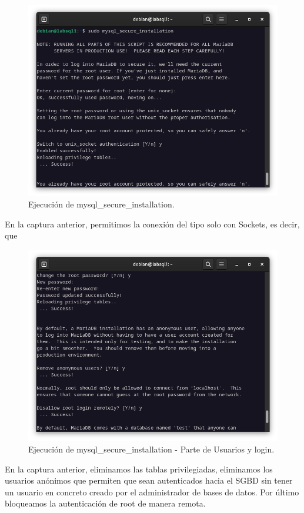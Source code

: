 \begin{figure}[H]
	\centering
	\includegraphics[scale=0.30]{01}
	\caption{Ejecución de mysql\_secure\_installation.}
\end{figure}

En la captura anterior, permitimos la conexión del tipo solo con Sockets, es decir, que 

\begin{figure}[H]
	\centering
	\includegraphics[scale=0.30]{02}
	\caption{Ejecución de mysql\_secure\_installation - Parte de Usuarios y login.}
\end{figure}

En la captura anterior, eliminamos las tablas privilegiadas, eliminamos los usuarios anónimos que permiten que sean autenticados hacia el SGBD sin tener un usuario en concreto creado por el administrador de bases de datos. Por último bloqueamos la autenticación de root de manera remota.

